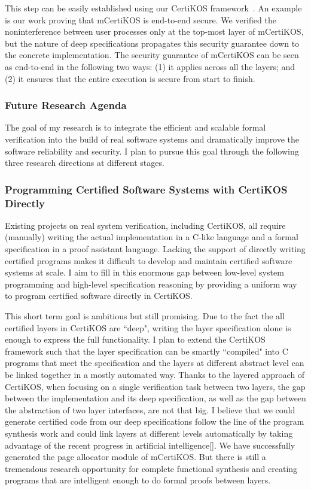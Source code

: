\documentclass[a4paper, 10pt]{article}
\begin{document}
\begin{small}
This step can be easily established
using our CertiKOS framework~\cite{pldi16-security}. An example is our work proving
that mCertiKOS is end-to-end secure. We verified the noninterference between user processes 
only at the top-most layer of mCertiKOS, but the nature of deep specifications propagates
this security guarantee down to the concrete implementation.
The security guarantee of mCertiKOS
can be seen as end-to-end in the following two ways: (1)
it applies across all the layers; and (2) it ensures that the entire
execution is secure from start to finish.

\subsubsection*{\large Future Research Agenda}
The goal of my research is to
integrate the efficient and scalable formal verification
into the build of real software systems
and dramatically improve the software reliability and security. 
I plan to pursue this goal through the following three research directions at different stages.


\subsubsection*{\small Programming Certified Software Systems with CertiKOS Directly}
Existing  projects on real system verification,
including CertiKOS, all require   (manually)  writing the actual implementation
 in a C-like language and a formal specification in a proof assistant language.
Lacking the support of directly writing certified  programs  makes it difficult to develop and maintain certified  software systems
at scale. I aim to fill in this enormous gap between low-level system programming and high-level specification reasoning
by
providing
a uniform way to program certified software directly in CertiKOS.

This short term goal is ambitious  but still promising.
Due to the fact the all certified layers in CertiKOS
are ``deep", writing the layer specification alone is enough
to express the full functionality. I plan to extend the CertiKOS
framework such that the layer specification can be smartly 
``compiled" into C programs that meet the specification
and the layers at different abstract level can be linked together in a mostly automated way. Thanks to the layered approach of CertiKOS,
when focusing on a single verification task between two layers,
 the gap between the implementation and its deep specification, as well as the gap between the abstraction of two layer interfaces,
are not that big. I believe that we could generate
certified code from our deep specifications
follow the line of the program synthesis work
and could link layers at different levels automatically
by taking advantage of the recent progress in
artificial intelligence[]. We have successfully generated
the page allocator module of mCertiKOS. But there is
still a tremendous research opportunity for complete functional
synthesis and creating programs that are intelligent enough
to do formal proofs between layers.


\end{small}
\end{document}
